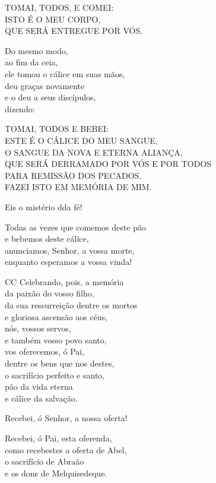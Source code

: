\documentclass{book}
\begin{document}
\begin{flushleft}
    TOMAI, TODOS, E COMEI: \\
    ISTO É O MEU CORPO, \\
    QUE SERÁ ENTREGUE POR VÓS.

    Do mesmo modo, \\
    ao fim da ceia, \\
    ele tomou o cálice em suas mãos, \\
    deu graças novamente \\
    e o deu a seus discípulos, \\
    dizendo:

    TOMAI, TODOS E BEBEI: \\
    ESTE É O CÁLICE DO MEU SANGUE, \\
    O SANGUE DA NOVA E ETERNA ALIANÇA, \\
    QUE SERÁ DERRAMADO POR VÓS E POR TODOS \\
    PARA REMISSÃO DOS PECADOS. \\
    FAZEI ISTO EM MEMÓRIA DE MIM.

    Eis o mistério dda fé!

    Todas as vezes que comemos deste pão \\
    e bebemos deste cálice, \\
    anunciamos, Senhor, a vossa morte, \\
    enquanto esperamos a vossa vinda!

    CC Celebrando, pois, a memória \\
    da paixão do vosso filho, \\
    da sua ressurreição dentre os mortos \\
    e gloriosa ascensão aos céus, \\
    nós, vossos servos, \\
    e também vosso povo santo, \\
    vos oferecemos, ó Pai, \\
    dentre os bens que nos destes, \\
    o sacrifício perfeito e santo, \\
    pão da vida eterna \\
    e cálice da salvação.

    Recebei, ó Senhor, a nossa oferta!

    Recebei, ó Pai, esta oferenda, \\
    como recebestes a oferta de Abel, \\
    o sacrifício de Abraão \\
    e os dons de Melquisedeque.


\end{flushleft}
\end{document}
